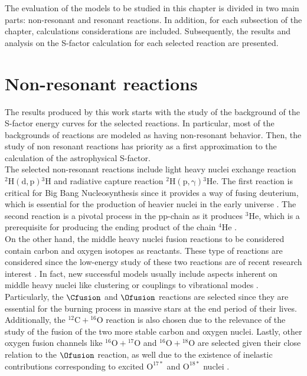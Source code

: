 \documentclass[openany]{book}
\begin{document}
The evaluation of the models to be studied in this chapter is divided in two main parts: non-resonant and resonant reactions.  In addition, for each subsection of the chapter, calculations considerations are included. Subsequently, the results and analysis on the S-factor calculation for each  selected reaction are presented.

\section{Non-resonant reactions} \label{sec:nonResonant}

The  results produced by this work starts with the study of the background of the S-factor energy curves for the selected reactions. In particular, most of the backgrounds of reactions are modeled as having non-resonant behavior. Then, the study of non resonant reactions has priority as a first approximation to the calculation of the astrophysical S-factor. \\

The selected non-resonant reactions include light heavy nuclei exchange reaction $\mathrm{{}^{2}{H}(d,p){}^{3}{H}} $ and radiative capture reaction  $\mathrm{{}^{2}{H} (p, \gamma) {}^{3}{He}} $. The first reaction is critical for Big Bang Nucleosynthesis since it provides a way of fusing deuterium, which is essential for the production of heavier nuclei in the early universe \cite{coc_vangioni_2010}. The second reaction is a pivotal process in the pp-chain as it produces $\mathrm{{}^{3}He}$, which is a prerequisite  for producing the ending product of the chain $\mathrm{{}^{4}He}$ \cite{fowler_1958}. \\

 On the other hand, the middle heavy nuclei fusion reactions to be considered contain carbon and oxygen isotopes as reactants. These type of reactions are considered since the low-energy study of these two reactions are of recent research interest \cite{mukhamedzhanov_pang_kadyrov_2019, taniguchi_kimura_2021, torilov_maltsev_zherebchevsky_2021}. In fact, new successful models usually include aspects inherent on middle heavy nuclei like clustering \cite{assuncao_descouvemont_2016} or couplings to vibrational modes \cite{duarte_gasques_oliveira_zagatto_chamon_medina_added_seale_alcantara-nunez_rossi_et_2015}. \\
 
 Particularly, the $\Cfusion$  and $\Ofusion$ reactions are selected since they are essential for the burning process in massive stars at the end period of their lives. Additionally, the $\mathrm{{}^{12}C + {}^{16}O}$ reaction is also chosen due to the relevance of the study of the fusion of the two more stable carbon and oxygen nuclei. Lastly, other oxygen fusion channels like $\mathrm{{}^{16}O + {}^{17}O}$ and $\mathrm{{}^{16}O + {}^{18}O}$ are selected given their close relation to the $\Ofusion$ reaction, as well due to the existence of inelastic contributions corresponding to excited $\mathrm{O^{17*}}$ and $\mathrm{O^{18*}}$ nuclei \cite{thomas_chen_hinds_meredith_olson_1986}.   \\
\end{document}
